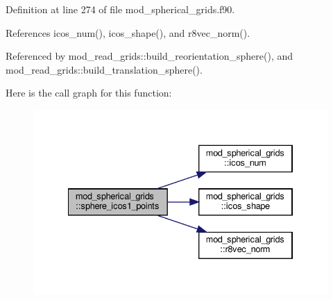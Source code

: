 Definition at line 274 of file mod\+\_\+spherical\+\_\+grids.\+f90.



References icos\+\_\+num(), icos\+\_\+shape(), and r8vec\+\_\+norm().



Referenced by mod\+\_\+read\+\_\+grids\+::build\+\_\+reorientation\+\_\+sphere(), and mod\+\_\+read\+\_\+grids\+::build\+\_\+translation\+\_\+sphere().

Here is the call graph for this function\+:
\nopagebreak
\begin{figure}[H]
\begin{center}
\leavevmode
\includegraphics[width=334pt]{namespacemod__spherical__grids_a58af853045eb54cbf3a8515e0f48b23b_cgraph}
\end{center}
\end{figure}
